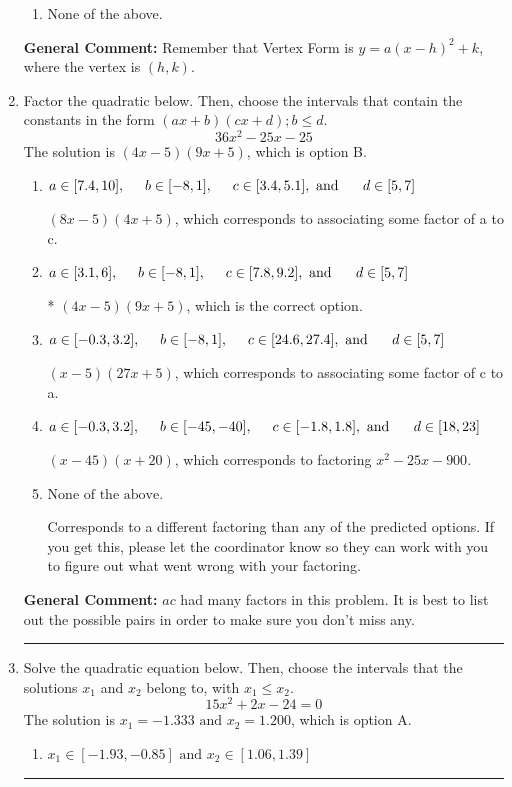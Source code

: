 \documentclass{extbook}[14pt]
\newcommand{\litem}[1]{\item #1

\rule{\textwidth}{0.4pt}}
\begin{document}
\begin{enumerate}
{\begin{enumerate}[label=\Alph*.]
\begin{multicols}{2}
\end{multicols}\item None of the above.\end{enumerate}
\textbf{General Comment:} Remember that Vertex Form is $y = a(x-h)^2+k$, where the vertex is $(h, k)$.
}
\litem{
Factor the quadratic below. Then, choose the intervals that contain the constants in the form $(ax+b)(cx+d); b \leq d.$
\[ 36x^{2} -25 x -25 \]
The solution is \( (4x -5)(9x + 5) \), which is option B.\begin{enumerate}[label=\Alph*.]
\item \( a \in [7.4, 10], \hspace*{5mm} b \in [-8, 1], \hspace*{5mm} c \in [3.4, 5.1], \text{ and } \hspace*{5mm} d \in [5, 7] \)

 $(8x -5)(4x + 5)$, which corresponds to associating some factor of a to c.
\item \( a \in [3.1, 6], \hspace*{5mm} b \in [-8, 1], \hspace*{5mm} c \in [7.8, 9.2], \text{ and } \hspace*{5mm} d \in [5, 7] \)

* $(4x -5)(9x + 5)$, which is the correct option.
\item \( a \in [-0.3, 3.2], \hspace*{5mm} b \in [-8, 1], \hspace*{5mm} c \in [24.6, 27.4], \text{ and } \hspace*{5mm} d \in [5, 7] \)

 $(x -5)(27x + 5)$, which corresponds to associating some factor of c to a.
\item \( a \in [-0.3, 3.2], \hspace*{5mm} b \in [-45, -40], \hspace*{5mm} c \in [-1.8, 1.8], \text{ and } \hspace*{5mm} d \in [18, 23] \)

 $(x -45)(x + 20)$, which corresponds to factoring $x^{2} -25 x -900$.
\item \( \text{None of the above.} \)

 Corresponds to a different factoring than any of the predicted options. If you get this, please let the coordinator know so they can work with you to figure out what went wrong with your factoring.
\end{enumerate}

\textbf{General Comment:} $ac$ had many factors in this problem. It is best to list out the possible pairs in order to make sure you don't miss any.
}
\litem{
Solve the quadratic equation below. Then, choose the intervals that the solutions $x_1$ and $x_2$ belong to, with $x_1 \leq x_2$.
\[ 15x^{2} +2 x -24 = 0 \]
The solution is \( x_1 = -1.333 \text{ and } x_2 = 1.200 \), which is option A.\begin{enumerate}[label=\Alph*.]
\item \( x_1 \in [-1.93, -0.85] \text{ and } x_2 \in [1.06, 1.39] \)


\end{enumerate}}
\end{enumerate}
\end{document}
